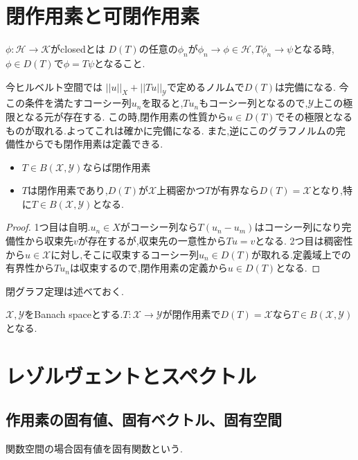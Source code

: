 \documentclass[uplatex]{jsbook}
\begin{document}
\section{閉作用素と可閉作用素}
\begin{screen}
\begin{dfn}
 $\phi: \mathcal{H} \to \mathcal{K}$がclosedとは
 $D(T)$の任意の$\phi_n$が$\phi_n \to \phi \in \mathcal{H}, T\phi_n \to \psi$となる時,$\phi \in D(T)$で$\phi = T\psi$となること.
\end{dfn}
\end{screen}

今ヒルベルト空間では
$||u||_X + ||Tu||_{\mathcal{Y}}$で定めるノルムで$D(T)$は完備になる.
今この条件を満たすコーシー列$u_n$を取ると,$Tu_n$もコーシー列となるので,$\mathcal{Y}$上この極限となる元が存在する.
この時,閉作用素の性質から$u \in D(T)$でその極限となるものが取れる.よってこれは確かに完備になる.
また,逆にこのグラフノルムの完備性からでも閉作用素は定義できる.

\begin{thm}
  \begin{itemize}
    \item $T \in B(\mathcal{X}, \mathcal{Y})$ならば閉作用素
    \item $T$は閉作用素であり,$D(T)$が$\mathcal{X}$上稠密かつ$T$が有界なら$D(T) = \mathcal{X}$となり,特に$T \in B(\mathcal{X}, \mathcal{Y})$となる.
  \end{itemize}
\end{thm}
\begin{proof}
  1つ目は自明.$u_n \in X$がコーシー列なら$T(u_n - u_m)$はコーシー列になり完備性から収束先$v$が存在するが,収束先の一意性から$Tu = v$となる.
  2つ目は稠密性から$u \in \mathcal{X}$に対し,そこに収束するコーシー列$u_n \in D(T)$が取れる.定義域上での有界性から$Tu_n$は収束するので,閉作用素の定義から$u \in D(T)$となる.

\end{proof}



閉グラフ定理は述べておく.
\begin{thm}
 $\mathcal{X}, \mathcal{Y}$をBanach spaceとする.$T: \mathcal{X} \to \mathcal{Y}$が閉作用素で$D(T)= \mathcal{X}$なら$T \in B(\mathcal{X}, \mathcal{Y})$となる.
\end{thm}

\section{レゾルヴェントとスペクトル}
\subsection{作用素の固有値、固有ベクトル、固有空間}
関数空間の場合固有値を固有関数という.
\end{document}
